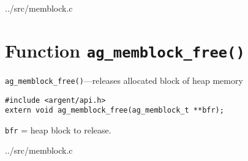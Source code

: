 \lstset{style=CODE}

  {../src/memblock.c}



%


\section{Function \texttt{ag\_memblock\_free()}}

\begin{noteblock}
\small
\verb|ag_memblock_free()|---releases allocated block of heap memory
\lstset{style=SYNOPSIS}
\begin{lstlisting}
#include <argent/api.h>
extern void ag_memblock_free(ag_memblock_t **bfr);
\end{lstlisting}
\verb|bfr| = heap block to release.
\end{noteblock}

\lstset{style=CODE}

  {../src/memblock.c}
